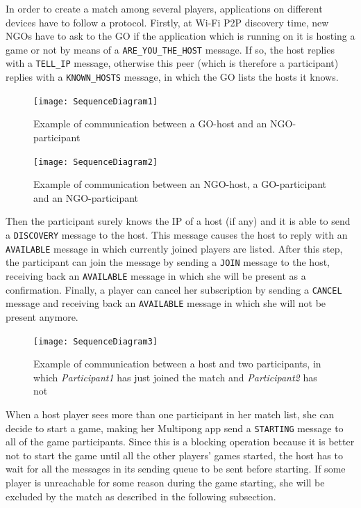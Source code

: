 In order to create a match among several players, applications on different
devices have to follow a protocol. Firstly, at Wi-Fi P2P discovery time, new
NGOs have to ask to the GO if the application which is running on it is hosting
a game or not by means of a \texttt{ARE\_YOU\_THE\_HOST} message. If so, the
host replies with a \texttt{TELL\_IP} message, otherwise this peer (which is
therefore a participant) replies with a \texttt{KNOWN\_HOSTS} message, in which
the GO lists the hosts it knows.

\begin{figure}[h]
    \centering
    \texttt{[image: SequenceDiagram1]}
    \caption{Example of communication between a GO-host and an NGO-participant}
    \label{fig:seqDiagram1}
\end{figure}

\begin{figure}[h]
    \centering
    \texttt{[image: SequenceDiagram2]}
    \caption{Example of communication between an NGO-host, a GO-participant
     and an NGO-participant}
    \label{fig:seqDiagram2}
\end{figure}

Then the participant surely knows the IP of a host (if any) and it is able to
send a \texttt{DISCOVERY} message to the host. This message causes the host to
reply with an \texttt{AVAILABLE} message in which currently joined players are
listed. After this step, the participant can join the message by sending a
\texttt{JOIN} message to the host, receiving back an \texttt{AVAILABLE} message
in which she will be present as a confirmation. Finally, a player can cancel
her subscription by sending a \texttt{CANCEL} message and receiving back an
\texttt{AVAILABLE} message in which she will not be present anymore.

\begin{figure}[h]
    \centering
    \texttt{[image: SequenceDiagram3]}
    \caption{Example of communication between a host and two participants,
     in which \emph{Participant1} has just joined the match and
     \emph{Participant2} has not}
    \label{fig:seqDiagram3}
\end{figure}

When a host player sees more than one participant in her match list, she can
decide to start a game, making her Multipong app send a \texttt{STARTING}
message to all of the game participants. Since this is a blocking operation
because it is better not to start the game until all the other players' games
started, the host has to wait for all the messages in its sending queue to be
sent before starting. If some player is unreachable for some reason
during the game starting, she will be excluded by the match as described in
the following subsection.



